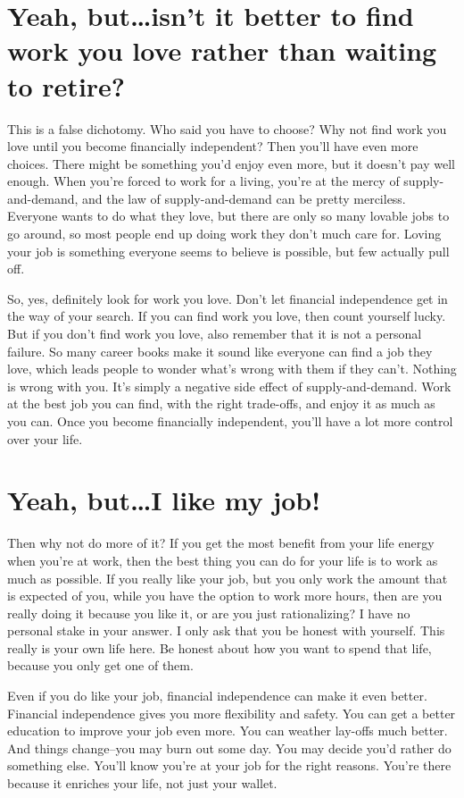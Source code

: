 \section{Yeah, but\ldots isn't it better to find work you love rather than waiting to retire?}
This is a false dichotomy. Who said you have to choose? Why not find work you love until you become financially independent? Then you'll have even more choices. There might be something you'd enjoy even more, but it doesn't pay well enough. When you're forced to work for a living, you're at the mercy of supply-and-demand, and the law of supply-and-demand can be pretty merciless. Everyone wants to do what they love, but there are only so many lovable jobs to go around, so most people end up doing work they don't much care for. Loving your job is something everyone seems to believe is possible, but few actually pull off.

So, yes, definitely look for work you love. Don't let financial independence get in the way of your search. If you can find work you love, then count yourself lucky. But if you don't find work you love, also remember that it is not a personal failure. So many career books make it sound like everyone can find a job they love, which leads people to wonder what's wrong with them if they can't. Nothing is wrong with you. It's simply a negative side effect of supply-and-demand. Work at the best job you can find, with the right trade-offs, and enjoy it as much as you can. Once you become financially independent, you'll have a lot more control over your life.

\section{Yeah, but\ldots I like my job!}
Then why not do more of it? If you get the most benefit from your life energy when you're at work, then the best thing you can do for your life is to work as much as possible. If you really like your job, but you only work the amount that is expected of you, while you have the option to work more hours, then are you really doing it because you like it, or are you just rationalizing? I have no personal stake in your answer. I only ask that you be honest with yourself. This really is your own life here. Be honest about how you want to spend that life, because you only get one of them.

Even if you do like your job, financial independence can make it even better. Financial independence gives you more flexibility and safety. You can get a better education to improve your job even more. You can weather lay-offs much better. And things change–you may burn out some day. You may decide you'd rather do something else. You'll know you're at your job for the right reasons. You're there because it enriches your life, not just your wallet.

